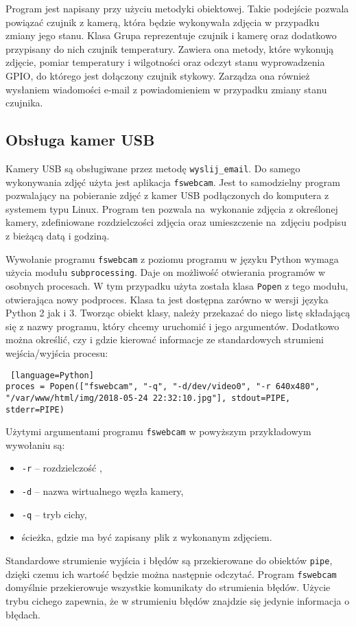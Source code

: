 \documentclass[a4paper,11pt,twoside]{article}
\begin{document}
Program jest napisany przy użyciu metodyki obiektowej. Takie podejście pozwala powiązać czujnik z kamerą, która będzie wykonywała zdjęcia w przypadku zmiany jego stanu. Klasa Grupa reprezentuje czujnik i kamerę oraz dodatkowo przypisany do nich czujnik temperatury. Zawiera ona metody, które wykonują zdjęcie, pomiar temperatury i wilgotności oraz odczyt stanu wyprowadzenia GPIO, do którego jest dołączony czujnik stykowy. Zarządza ona również wysłaniem wiadomości e-mail z powiadomieniem w przypadku zmiany stanu czujnika.

\subsection{Obsługa kamer USB}
Kamery USB są obsługiwane przez metodę \texttt{wyslij{\_}email}. Do samego wykonywania zdjęć użyta jest aplikacja \texttt{fswebcam}. Jest to samodzielny program pozwalający na pobieranie zdjęć z kamer USB podłączonych do komputera z systemem typu Linux. Program ten pozwala na~wykonanie zdjęcia z określonej kamery, zdefiniowane rozdzielczości zdjęcia oraz umieszczenie na~zdjęciu podpisu z bieżącą datą i godziną. 

Wywołanie programu \texttt{fswebcam} z poziomu programu w języku Python wymaga użycia modułu \texttt{subprocessing}. Daje on możliwość otwierania programów w osobnych procesach. W tym przypadku użyta została klasa \texttt{Popen} z tego modułu, otwierająca nowy podproces. Klasa ta jest dostępna zarówno w wersji języka Python 2 jak i 3. Tworząc obiekt klasy, należy przekazać do niego listę składającą się z nazwy programu, który chcemy uruchomić i jego argumentów. Dodatkowo można określić, czy i gdzie kierować informacje ze standardowych strumieni wejścia/wyjścia procesu:

\begin{lstlisting} [language=Python]
proces = Popen(["fswebcam", "-q", "-d/dev/video0", "-r 640x480", "/var/www/html/img/2018-05-24 22:32:10.jpg"], stdout=PIPE, stderr=PIPE)
\end{lstlisting}

Użytymi argumentami programu \texttt{fswebcam} w powyższym przykładowym wywołaniu są:
\begin{itemize}
\item \texttt{-r} -- rozdzielczość , 
\item \texttt{-d} -- nazwa wirtualnego węzła kamery,
\item \texttt{-q} -- tryb cichy,
\item ścieżka, gdzie ma być zapisany plik z wykonanym zdjęciem.
\end{itemize}
Standardowe strumienie wyjścia i błędów są przekierowane do obiektów \texttt{pipe}, dzięki czemu ich wartość będzie można następnie odczytać. Program \texttt{fswebcam} domyślnie przekierowuje wszystkie komunikaty do strumienia błędów. Użycie trybu cichego zapewnia, że w strumieniu błędów znajdzie się jedynie informacja o błędach.
\end{document}
